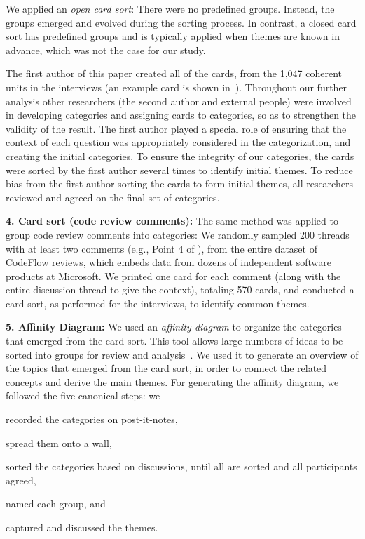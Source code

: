 We applied an \emph{open card sort}: There were no predefined groups. Instead, the
groups emerged and evolved during the sorting process. In contrast, a closed
card sort has predefined groups and is typically applied when themes are known
in advance, which was not the case for our study.

The first author of this paper created all of the cards, from the 1,047
coherent units in the interviews (an example card is shown in~\cite{bacchelli2012appendix}). Throughout our further analysis other
researchers (the second author and external people) were involved in developing
categories and assigning cards to categories, so as to strengthen the validity
of the result. The first author played a special role of ensuring that the
context of each question was appropriately considered in the categorization,
and creating the initial categories. To ensure the integrity of our categories,
the cards were sorted by the first author several times to identify initial
themes. To reduce bias from the first author sorting the cards to form initial themes, all researchers reviewed and agreed on the final set of
categories.

\textbf{4. Card sort (code review comments):} The same method was applied to group code
review comments into categories: We randomly sampled 200 threads with at least
two comments (e.g., Point 4 of ), from the entire dataset of CodeFlow
reviews, which embeds data from dozens of independent software products at
Microsoft. We printed one card for each comment (along with the entire
discussion thread to give the context), totaling 570 cards, and conducted a
card sort, as performed for the interviews, to identify common themes.

\textbf{5. Affinity Diagram:} We used an \emph{affinity diagram} to organize the categories
that emerged from the card sort. This tool allows large numbers of ideas to be
sorted into groups for review and analysis~\cite{shade2000improving}. We used it
to generate an overview of the topics that emerged from the card sort, in order
to connect the related concepts and derive the main themes. For generating the
affinity diagram, we followed the five canonical steps: we \begin{inparaenum}[(1)] 
\item recorded the categories on post-it-notes, 
\item spread them onto a wall, 
\item sorted the categories based on discussions, until all are sorted and all participants agreed, 
\item named each group, and 
\item captured and discussed the themes.
\end{inparaenum}



